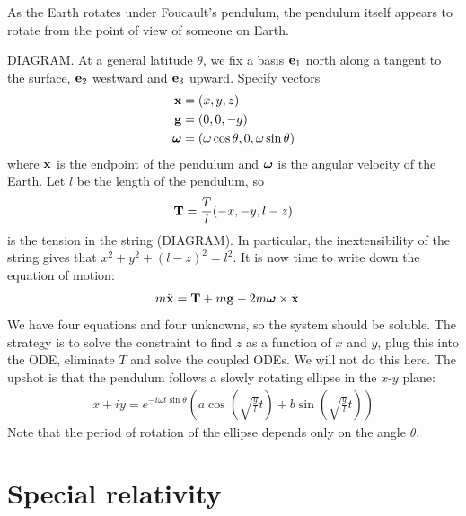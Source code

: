 \documentclass{../../template/note}
\begin{document}

    \begin{example}
        As the Earth rotates under Foucault's pendulum, the pendulum itself appears to rotate from the point of view of someone on Earth.

        DIAGRAM. At a general latitude \(\theta\), we fix a basis \(\V e_1\) north along a tangent to the surface, \(\V e_2\) westward and \(\V e_3\) upward. Specify vectors
        \begin{align*}
            \V x &= (x, y, z) \\
            \V g &= (0, 0, -g) \\
            \V \omega &= (\omega \cos \theta, 0, \omega \sin \theta)
        \end{align*}
        where \(\V x\) is the endpoint of the pendulum and \(\V \omega\) is the angular velocity of the Earth. Let \(l\) be the length of the pendulum, so 
        \begin{align*}
            \V T = \frac{T}{l} (-x, -y, l-z)
        \end{align*}
        is the tension in the string (DIAGRAM). In particular, the inextensibility of the string gives that \(x^2 + y^2 + (l-z)^2 = l^2\). It is now time to write down the equation of motion:
        \begin{align*}
            m \ddot{\V x} &= \V T + m \V g - 2m \V \omega \times \dot{\V x}
        \end{align*}
        We have four equations and four unknowns, so the system should be soluble. The strategy is to solve the constraint to find \(z\) as a function of \(x\) and \(y\), plug this into the ODE, eliminate \(T\) and solve the coupled ODEs. We will not do this here. The upshot is that the pendulum follows a slowly rotating ellipse in the \(x\)-\(y\) plane:
        \begin{align*}
            x+iy = e^{-i\omega t \sin \theta}\left(a \cos\left(\sqrt{\frac g l}t\right)+b \sin\left(\sqrt{\frac g l}t\right)\right)
        \end{align*}
        Note that the period of rotation of the ellipse depends only on the angle \(\theta\).
    \end{example}
    
    \section{Special relativity}
\end{document}
